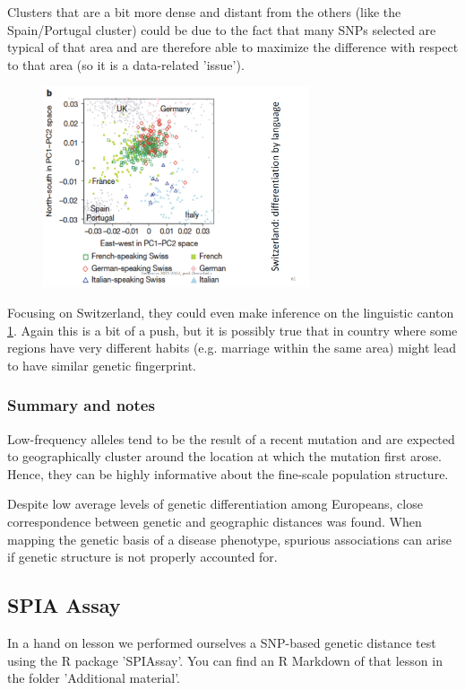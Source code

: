 Clusters that are a bit more dense and distant from the others (like the
Spain/Portugal cluster) could be due to the fact that many SNPs selected are
typical of that area and are therefore able to maximize the difference with
respect to that area (so it is a data-related 'issue').

\begin{figure}
	\centering
	\includegraphics[width=0.7\textwidth]{PCA_swiss.PNG}
	\caption{\label{fig: PCA_swiss}}
\end{figure}

Focusing on Switzerland, they could even make inference on the linguistic canton
\ref{fig: PCA_swiss}. Again this is a bit of a push, but it is possibly true
that in country where some regions have very different habits (e.g. marriage
within the same area) might lead to have similar genetic fingerprint. 


\subsubsection{Summary and notes}
Low-frequency alleles tend to be the result of a recent mutation and are
expected to geographically cluster around the location at which the mutation
first arose. Hence, they can be highly informative about the fine-scale
population structure.

Despite low average levels of genetic differentiation among Europeans, close
correspondence between genetic and geographic distances was found. When mapping
the genetic basis of a disease phenotype, spurious associations can arise if
genetic structure is not properly accounted for.



\subsection{SPIA Assay}
In a hand on lesson we performed ourselves a SNP-based genetic distance test
using the R package 'SPIAssay'. You can find an R Markdown of that lesson in the
folder 'Additional material'. 
